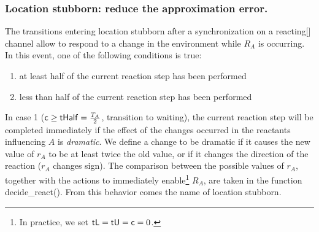 \documentclass{llncs}
\newcommand{\ta}{Timed Automaton}
\begin{document}
\subsubsection{Location {\sf stubborn}: reduce the approximation error.}
The transitions entering location {\sf stubborn} after a synchronization on a {\sf reacting[]}
channel allow to respond to a change in the environment while $R_A$ is occurring.
% 
In this event, one of the following conditions is true:
\begin{enumerate}
  \item at least half of the current reaction step has been performed
  \item less than half of the current reaction step has been performed
\end{enumerate}

In case 1 (${\sf c} \ge {\sf tHalf} = \frac{T_A}{2}$, transition to {\sf waiting}), the current reaction step
will be completed immediately if the effect of the changes occurred in the reactants influencing
$A$ is \emph{dramatic}. We define a change to be dramatic if it causes the new value of $r_A$ to be at least
twice the old value, or if it changes the direction of the reaction ($r_A$ changes sign). The comparison
between the possible values of $r_A$, together with the actions to immediately enable\footnote{
In practice, we set ${\sf tL} = {\sf tU} = {\sf c} = 0$.} $R_A$,
are taken in the function {\sf decide\_react()}. From this behavior comes the name of location {\sf stubborn}.
\end{document}
